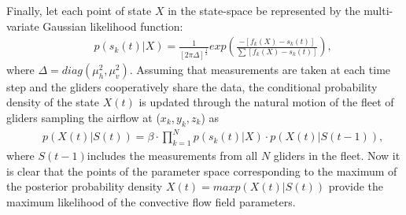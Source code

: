 \documentclass{ifacconf}
\begin{document}
Finally, let each point of state $X$ in the state-space be represented by the multi-variate Gaussian
likelihood function:
\begin{eqnarray*}
    && p(s_k(t)\vert X)=\frac{1}{[2\pi \Delta]^\frac{1}{2}}  exp( \frac{-[f_k(X)-s_k(t)]}{\sum
    [f_k(X)-s_k(t)] }),
    \label{eq:BayesLikeLH}
\end{eqnarray*}
where $\Delta=diag(\mu^2_h,\mu^2_v)$. Assuming that measurements are taken at each time step and the
gliders cooperatively share the data, the conditional probability density of the state $X(t)$ is
updated through the natural motion of the fleet of gliders sampling the airflow at ($x_k,y_k,z_k$) as
\begin{eqnarray*}
    && p(X(t)\vert S(t))=\beta \cdot \prod_{k=1}^N p(s_k(t) \vert X)\cdot p(X(t) \vert S(t-1)),
    \label{eq:CondProb}
\end{eqnarray*}
where $S(t-1)$includes the measurements from all $N$ gliders in the fleet. Now it is
clear that the points of the parameter space corresponding to the maximum of the
posterior probability density $X(t)=max p(X(t) \vert S(t))$ provide the maximum
likelihood of the convective flow field parameters.
%
\end{document}
